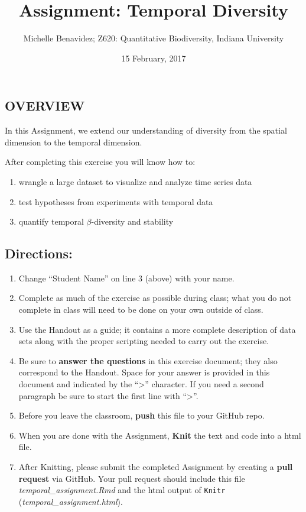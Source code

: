 \documentclass[]{article}
\title{Assignment: Temporal Diversity}
\author{Michelle Benavidez; Z620: Quantitative Biodiversity, Indiana University}
\date{15 February, 2017}
\providecommand{\tightlist}{%
  \setlength{\itemsep}{0pt}\setlength{\parskip}{0pt}}
\begin{document}
\maketitle

\subsection{OVERVIEW}\label{overview}

In this Assignment, we extend our understanding of diversity from the
spatial dimension to the temporal dimension.

After completing this exercise you will know how to:

\begin{enumerate}
\def\labelenumi{\arabic{enumi}.}
\tightlist
\item
  wrangle a large dataset to visualize and analyze time series data
\item
  test hypotheses from experiments with temporal data
\item
  quantify temporal \(\beta\)-diversity and stability
\end{enumerate}

\subsection{Directions:}\label{directions}

\begin{enumerate}
\def\labelenumi{\arabic{enumi}.}
\tightlist
\item
  Change ``Student Name'' on line 3 (above) with your name.
\item
  Complete as much of the exercise as possible during class; what you do
  not complete in class will need to be done on your own outside of
  class.
\item
  Use the Handout as a guide; it contains a more complete description of
  data sets along with the proper scripting needed to carry out the
  exercise.
\item
  Be sure to \textbf{answer the questions} in this exercise document;
  they also correspond to the Handout. Space for your answer is provided
  in this document and indicated by the ``\textgreater{}'' character. If
  you need a second paragraph be sure to start the first line with
  ``\textgreater{}''.
\item
  Before you leave the classroom, \textbf{push} this file to your GitHub
  repo.
\item
  When you are done with the Assignment, \textbf{Knit} the text and code
  into a html file.
\item
  After Knitting, please submit the completed Assignment by creating a
  \textbf{pull request} via GitHub. Your pull request should include
  this file \emph{temporal\_assignment.Rmd} and the html output of
  \texttt{Knitr} (\emph{temporal\_assignment.html}).
\end{enumerate}
\end{document}
